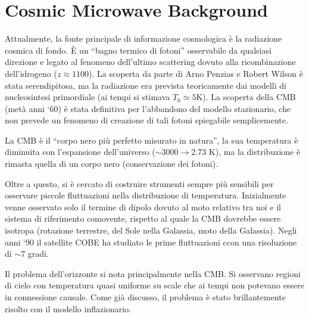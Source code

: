 \chapter{Cosmic Microwave Background}\label{11:ch}
Attualmente, la fonte principale di informazione cosmologica è la radiazione cosmica di fondo. È un ``bagno termico di fotoni'' osservabile da qualsiasi direzione e legato al fenomeno dell'ultimo scattering dovuto alla ricombinazione dell'idrogeno ($z\approx 1100$). La scoperta da parte di Arno Penzias e Robert Wilson è stata serendipitosa, ma la radiazione era prevista teoricamente dai modelli di nucleosintesi primordiale (ai tempi si stimava $T_0\simeq 5$K). La scoperta della CMB (metà anni `60) è stata definitiva per l'abbandono del modello stazionario, che non prevede un fenomeno di creazione di tali fotoni spiegabile semplicemente. 

La CMB è il ``corpo nero più perfetto misurato in natura'', la sua temperatura è diminuita con l'espansione dell'universo ($\sim 3000 \to 2.73$ K), ma la distribuzione è rimasta quella di un corpo nero (conservazione dei fotoni). 

Oltre a questo, si è cercato di costruire strumenti sempre più sensibili per osservare piccole fluttuazioni nella distribuzione di temperatura. Inizialmente venne osservato solo il termine di dipolo dovuto al moto relativo tra noi e il sistema di riferimento comovente, rispetto al quale la CMB dovrebbe essere isotropa (rotazione terrestre, del Sole nella Galassia, moto della Galassia). Negli anni `90 il satellite COBE ha studiato le prime fluttuazioni ccon una risoluzione di $\sim 7$ gradi. 

Il problema dell'orizzonte si nota principalmente nella CMB. Si osservano regioni di cielo con temperatura quasi uniforme su scale che ai tempi non potevano essere in connessione causale. Come già discusso, il problema è stato brillantemente risolto con il modello inflazionario. 

